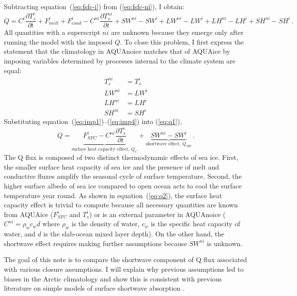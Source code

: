 \documentclass{article}
\begin{document}
Subtracting equation~(\ref{eq:fsfc-i}) from (\ref{eq:fsfc-ni}), I obtain:
\begin{equation}\label{eq:q1}
    Q =  C^i\frac{\partial T^{i}_{s}}{\partial t} + F^i_{melt} + F^i_{cond} - C^{ni}\frac{\partial T^{ni}_{s}}{\partial t} + SW^{ni} - SW^{i} + LW^{ni} - LW^{i} + LH^{ni} - LH^{i} + SH^{ni} - SH^{i} \, .
\end{equation}
All quantities with a superscript $ni$ are unknown because they emerge only after running the model with the imposed $Q$. To close this problem, I first express the statement that the climatology in AQUAnoice matches that of AQUAice by imposing variables determined by processes internal to the climate system are equal:
\begin{align}
    T^{ni}_s &= T^i_s \label{eq:imp1}\\
    LW^{ni} &= LW^i \label{eq:imp2}\\
    LH^{ni} &= LH^i \label{eq:imp3}\\
    SH^{ni} &= SH^i \label{eq:imp4}
\end{align}
Substituting equation~(\ref{eq:imp1})--(\ref{eq:imp4}) into (\ref{eq:q1}),
\begin{equation}\label{eq:q2}
    Q =  \underbrace{F^i_{SFC} - C^{ni}\frac{\partial T^{i}_{s}}{\partial t}}_{\text{surface heat capacity effect, }Q_C} + \underbrace{SW^{ni} - SW^{i}}_{\text{shortwave effect, }Q_{SW}} \, .
\end{equation}
The Q flux is composed of two distinct thermodynamic effects of sea ice. First, the smaller surface heat capacity of sea ice and the presence of melt and conductive fluxes amplify the seasonal cycle of surface temperature. Second, the higher surface albedo of sea ice compared to open ocean acts to cool the surface temperature year round. As shown in equation~(\ref{eq:q2}), the surface heat capacity effect is trivial to compute because all necessary quantities are known from AQUAice ($F^i_{SFC}$ and $T^i_s$) or is an external parameter in AQUAnoice ($C^{ni}=\rho_w c_w d$ where $\rho_w$ is the density of water, $c_w$ is the specific heat capacity of water, and $d$ is the slab-ocean mixed layer depth). On the other hand, the shortwave effect requires making further assumptions because $SW^{ni}$ is unknown.

The goal of this note is to compare the shortwave component of Q flux associated with various closure assumptions. I will explain why previous assumptions led to biases in the Arctic climatology and show this is consistent with previous literature on simple models of surface shortwave absorption \citep{winton2005}.
\end{document}
